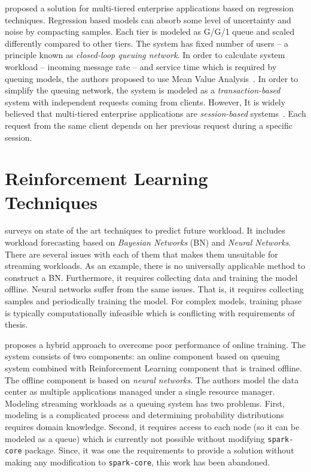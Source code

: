 \textcite{Zhang:2007} proposed a solution for multi-tiered enterprise applications based on regression techniques. Regression based models can absorb some level of uncertainty and noise by compacting samples. Each tier is modeled as G/G/1 queue and scaled differently compared to other tiers. The system has fixed number of users -- a principle known as \emph{closed-loop queuing network}. In order to calculate system workload -- incoming message rate -- and service time which is required by queuing models, the authors proposed to use Mean Value Analysis~\cite{Menasce:2004}. In order to simplify the queuing network, the system is modeled as a \emph{transaction-based} system with independent requests coming from clients. However, It is widely believed that multi-tiered enterprise applications are \emph{session-based} systems~\cite{Cherkasova:2002}. Each request from the same client depends on her previous request during a specific session.
 
\section{Reinforcement Learning Techniques}
\label{related:rl}

\textcite{Herbst:2017} surveys on state of the art techniques to predict future workload. It includes workload forecasting based on \emph{Bayesian Networks} (BN) and \emph{Neural Networks}. There are several issues with each of them that makes them unsuitable for streaming workloads. As an example, there is no universally applicable method to construct a BN. Furthermore, it requires collecting data and training the model offline. Neural networks suffer from the same issues. That is, it requires collecting samples and periodically training the model. For complex models, training phase is typically computationally infeasible which is conflicting with requirements of thesis.

\textcite{Tesauro2006} proposes a hybrid approach to overcome poor performance of online training. The system consists of two components: an online component based on queuing system combined with Reinforcement Learning component that is trained offline. The offline component is based on \emph{neural networks}. The authors model the data center as multiple applications managed under a single resource manager. Modeling streaming workloads as a queuing system has two problems. First, modeling is a complicated process and determining probability distributions requires domain knowledge. Second, it requires access to each node (so it can be modeled as a queue) which is currently not possible without modifying \lstinline$spark-core$ package. Since, it was one the requirements to provide a solution without making any modification to \lstinline$spark-core$, this work has been abandoned.

